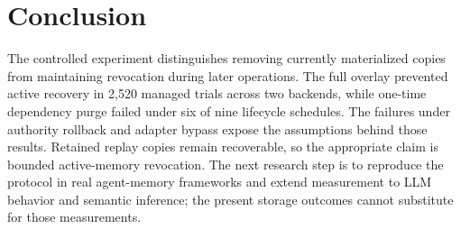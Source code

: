 ﻿\documentclass[sigconf,nonacm]{acmart}
\begin{document}
\section{Conclusion}
The controlled experiment distinguishes removing currently materialized copies from maintaining revocation during later operations. The full overlay prevented active recovery in 2,520 managed trials across two backends, while one-time dependency purge failed under six of nine lifecycle schedules. The failures under authority rollback and adapter bypass expose the assumptions behind those results. Retained replay copies remain recoverable, so the appropriate claim is bounded active-memory revocation. The next research step is to reproduce the protocol in real agent-memory frameworks and extend measurement to LLM behavior and semantic inference; the present storage outcomes cannot substitute for those measurements.
\end{document}
